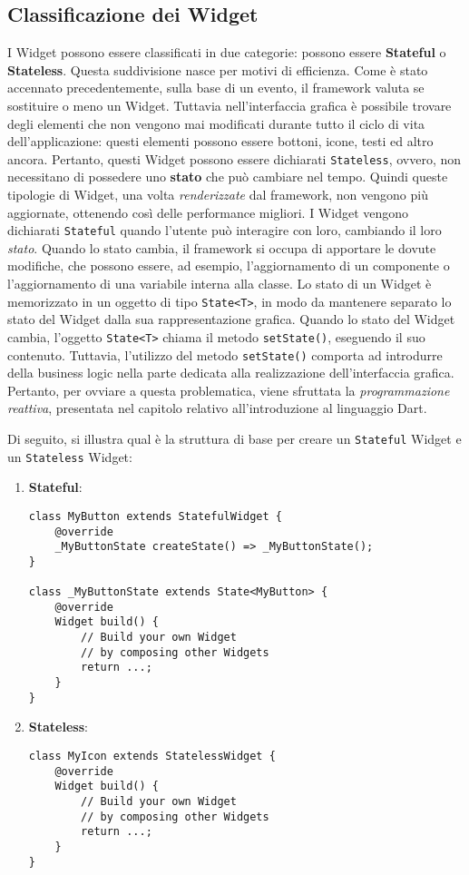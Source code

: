 \subsection{Classificazione dei Widget}
I Widget possono essere classificati in due categorie: possono essere \textbf{Stateful} o \textbf{Stateless}. Questa suddivisione nasce per motivi di efficienza. Come è stato accennato precedentemente, sulla base di un evento, il framework valuta se sostituire o meno un Widget. Tuttavia nell'interfaccia grafica è possibile trovare degli elementi che non vengono mai modificati durante tutto il ciclo di vita dell'applicazione: questi elementi possono essere bottoni, icone, testi ed altro ancora. Pertanto, questi Widget possono essere dichiarati \verb|Stateless|, ovvero, non necessitano di possedere uno \textbf{stato} che può cambiare nel tempo. Quindi queste tipologie di Widget, una volta \textit{renderizzate} dal framework, non vengono più aggiornate, ottenendo così delle performance migliori. I Widget vengono dichiarati \verb|Stateful| quando l'utente può interagire con loro, cambiando il loro \textit{stato}. Quando lo stato cambia, il framework si occupa di apportare le dovute modifiche, che possono essere, ad esempio, l'aggiornamento di un componente o l'aggiornamento di una variabile interna alla classe. Lo stato di un Widget è memorizzato in un oggetto di tipo \verb|State<T>|, in modo da mantenere separato lo stato del Widget dalla sua rappresentazione grafica. Quando lo stato del Widget cambia, l'oggetto \verb|State<T>| chiama il metodo \verb|setState()|, eseguendo il suo contenuto. Tuttavia, l'utilizzo del metodo \verb|setState()| comporta ad introdurre della business logic nella parte dedicata alla realizzazione dell'interfaccia grafica. Pertanto, per ovviare a questa problematica, viene sfruttata la \textit{programmazione reattiva}, presentata nel capitolo relativo all'introduzione al linguaggio Dart.

Di seguito, si illustra qual è la struttura di base per creare un \verb|Stateful| Widget e un \verb|Stateless| Widget:
\begin{enumerate}
	\item \textbf{Stateful}:
\begin{lstlisting}
class MyButton extends StatefulWidget {
	@override
 	_MyButtonState createState() => _MyButtonState();
}

class _MyButtonState extends State<MyButton> {
	@override
	Widget build() {
		// Build your own Widget 
		// by composing other Widgets
		return ...;
	}
}
\end{lstlisting}
	\item \textbf{Stateless}:
\begin{lstlisting}
class MyIcon extends StatelessWidget {
	@override
	Widget build() {
		// Build your own Widget 
		// by composing other Widgets
		return ...;
	}
}
\end{lstlisting}
\end{enumerate}

